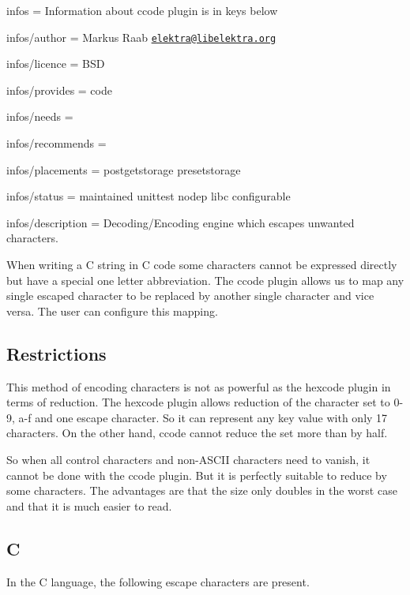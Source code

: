 
\begin{DoxyItemize}
\item infos = Information about ccode plugin is in keys below
\item infos/author = Markus Raab \href{mailto:elektra@libelektra.org}{\tt elektra@libelektra.\+org}
\item infos/licence = B\+SD
\item infos/provides = code
\item infos/needs =
\item infos/recommends =
\item infos/placements = postgetstorage presetstorage
\item infos/status = maintained unittest nodep libc configurable
\item infos/description = Decoding/\+Encoding engine which escapes unwanted characters.
\end{DoxyItemize}

When writing a C string in C code some characters cannot be expressed directly but have a special one letter abbreviation. The ccode plugin allows us to map any single escaped character to be replaced by another single character and vice versa. The user can configure this mapping.

\subsection*{Restrictions}

This method of encoding characters is not as powerful as the hexcode plugin in terms of reduction. The hexcode plugin allows reduction of the character set to \textquotesingle{}0\textquotesingle{}-\/\textquotesingle{}9\textquotesingle{}, \textquotesingle{}a\textquotesingle{}-\/\textquotesingle{}f\textquotesingle{} and one escape character. So it can represent any key value with only 17 characters. On the other hand, ccode cannot reduce the set more than by half.

So when all control characters and non-\/\+A\+S\+C\+II characters need to vanish, it cannot be done with the ccode plugin. But it is perfectly suitable to reduce by some characters. The advantages are that the size only doubles in the worst case and that it is much easier to read.

\subsection*{C}

In the C language, the following escape characters are present.


